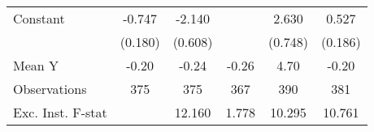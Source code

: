 {\begin{tabular}{l*{5}{c}}
\addlinespace
Constant            &      -0.747\sym{***}&      -2.140\sym{***}&                     &       2.630\sym{***}&       0.527\sym{***}\\
                    &     (0.180)         &     (0.608)         &                     &     (0.748)         &     (0.186)         \\
\midrule
Mean Y              &       -0.20         &       -0.24         &       -0.26         &        4.70         &       -0.20         \\
Observations        &         375         &         375         &         367         &         390         &         381         \\
Exc. Inst. F-stat   &                     &      12.160         &       1.778         &      10.295         &      10.761         \\
\bottomrule
\end{tabular}
}
